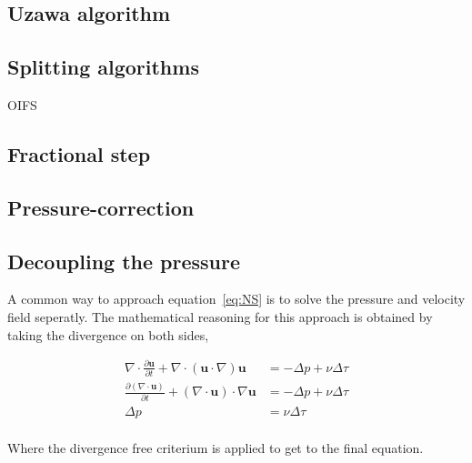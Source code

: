 \subsection{Uzawa algorithm}
\subsection{Splitting algorithms}
OIFS 
\subsection{Fractional step}
\subsection{Pressure-correction}

\subsection{Decoupling the pressure} 

A common way to approach equation~\ref{eq:NS} is to solve the pressure and velocity field
seperatly. The mathematical reasoning for this approach is obtained by taking the 
divergence on both sides, 

\begin{align}
	\nabla \cdot \frac{\partial \mathbf{u}}{\partial t} + 
    \nabla \cdot(\mathbf{u} \cdot \nabla) \mathbf{u} 
    &= -\Delta p + \nu \Delta \tau \\
	\frac{\partial (\nabla \cdot  \mathbf{u})}{\partial t} + 
    (\nabla \cdot \mathbf{u}) \cdot \nabla \mathbf{u} 
    &= -\Delta p + \nu \Delta \tau \\
   \Delta p &= \nu \Delta \tau \\
	\label{eq:pressuredecoupling}
\end{align}

Where the divergence free criterium is applied to get to the final equation.
